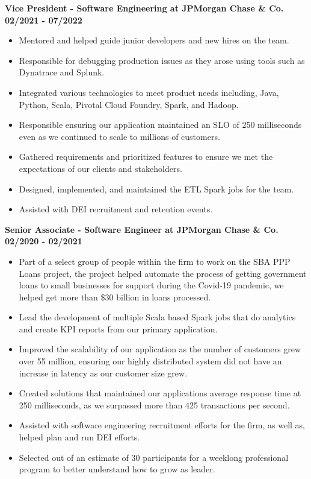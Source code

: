 \documentclass{res}
\begin{document}
\begin{resume}
	\textbf{Vice President - Software Engineering at JPMorgan Chase \& Co.}
	\hfill{\bf 02/2021 - 07/2022}
	\begin{itemize}
		\item Mentored and helped guide junior developers and new hires on the team.
		\item Responsible for debugging production issues as they arose using tools such as Dynatrace and Splunk. 
		\item Integrated various technologies to meet product needs including, Java, Python, Scala, Pivotal Cloud Foundry, Spark, and Hadoop.	
		\item Responsible ensuring our application maintained an SLO of 250 milliseconds even as we continued to scale to millions of customers.
		\item Gathered requirements and prioritized features to ensure we met the expectations of our clients and stakeholders.
		\item Designed, implemented, and maintained the ETL Spark jobs for the team.
		\item Assisted with DEI recruitment and retention events.
	\end{itemize}
	
	\textbf{Senior Associate - Software Engineer at JPMorgan Chase \& Co.}
	\hfill{\bf 02/2020 - 02/2021}
	\begin{itemize}
		\item Part of a select group of people within the firm to work on the SBA PPP Loans project, the project helped automate the process of getting government loans to small businesses for support during the Covid-19
pandemic, we helped get more than \$30 billion in loans processed.
		\item Lead the development of multiple Scala based Spark jobs that do analytics and create KPI reports from our primary application.
		\item Improved the scalability of our application as the number of customers grew over 55 million, ensuring our highly distributed system did not have an increase in latency as our customer size grew.
		\item Created solutions that maintained our applications average response time at 250 milliseconds, as we surpassed more than 425 transactions per second.
		\item Assisted with software engineering recruitment efforts for the firm, as well as, helped plan and run DEI efforts.
		\item Selected out of an estimate of 30 participants for a weeklong professional program to better understand how to grow as leader.
	\end{itemize}


\end{resume}
\end{document}
